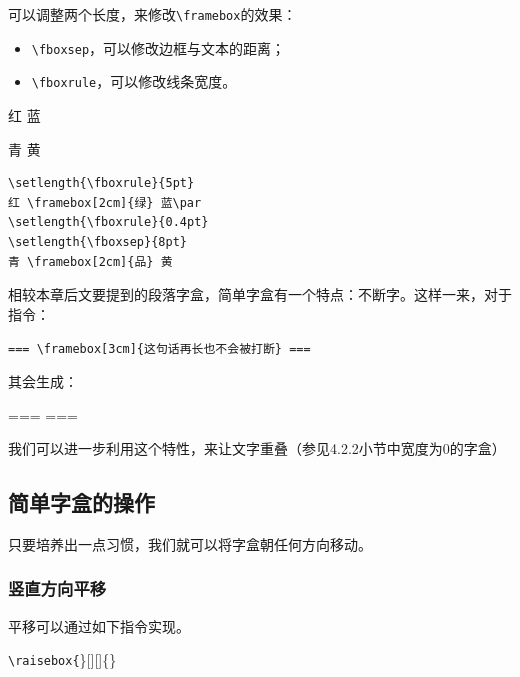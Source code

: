 可以调整两个长度，来修改\verb|\framebox|的效果：

\begin{itemize}
  \item \verb|\fboxsep|，可以修改边框与文本的距离；
  \item \verb|\fboxrule|，可以修改线条宽度。
\end{itemize}

\begin{codelist}[4.11]{
  \setlength{\fboxrule}{5pt}
红  蓝\par
\setlength{\fboxrule}{0.4pt}
\setlength{\fboxsep}{8pt}
青  黄
}
\begin{verbatim}
\setlength{\fboxrule}{5pt}
红 \framebox[2cm]{绿} 蓝\par
\setlength{\fboxrule}{0.4pt}
\setlength{\fboxsep}{8pt}
青 \framebox[2cm]{品} 黄\end{verbatim}
\end{codelist}

\begin{exclamation}
  相较本章后文要提到的段落字盒，简单字盒有一个特点：不断字。这样一来，对于\linebreak 指令：

\begin{dmd}
\verb|=== \framebox[3cm]{这句话再长也不会被打断} ===|
\end{dmd}
 
  其会生成：

  ===  ===

  我们可以进一步利用这个特性，来让文字重叠（参见4.2.2小节中宽度为0的字盒）
\end{exclamation}

\subsection{简单字盒的操作}

只要培养出一点习惯，我们就可以将字盒朝任何方向移动。

\subsubsection{竖直方向平移}

平移可以通过如下指令实现。

\begin{dmd}
\verb|\raisebox{|\}[][]\{\}
\end{dmd}

